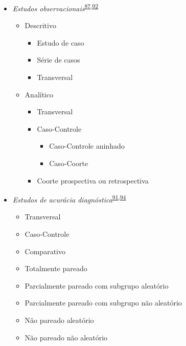 \documentclass[
]{book}
\providecommand{\tightlist}{%
  \setlength{\itemsep}{0pt}\setlength{\parskip}{0pt}}
\begin{document}
\begin{itemize}
\tightlist
\item
  \emph{Estudos observacionais}\textsuperscript{\protect\hyperlink{ref-Suxfct2014}{87},\protect\hyperlink{ref-Chidambaram2019}{92}}

  \begin{itemize}
  \tightlist
  \item
    Descritivo

    \begin{itemize}
    \tightlist
    \item
      Estudo de caso
    \item
      Série de casos
    \item
      Transversal
    \end{itemize}
  \item
    Analítico

    \begin{itemize}
    \tightlist
    \item
      Transversal
    \item
      Caso-Controle

      \begin{itemize}
      \tightlist
      \item
        Caso-Controle aninhado
      \item
        Caso-Coorte
      \end{itemize}
    \item
      Coorte prospectiva ou retrospectiva
    \end{itemize}
  \end{itemize}
\end{itemize}

\begin{itemize}
\tightlist
\item
  \emph{Estudos de acurácia diagnóstica}\textsuperscript{\protect\hyperlink{ref-Chassuxe92019}{91},\protect\hyperlink{ref-Yang2021}{94}}

  \begin{itemize}
  \tightlist
  \item
    Transversal
  \item
    Caso-Controle
  \item
    Comparativo
  \item
    Totalmente pareado
  \item
    Parcialmente pareado com subgrupo aleatório
  \item
    Parcialmente pareado com subgrupo não aleatório
  \item
    Não pareado aleatório
  \item
    Não pareado não aleatório
  \end{itemize}
\end{itemize}
\end{document}
